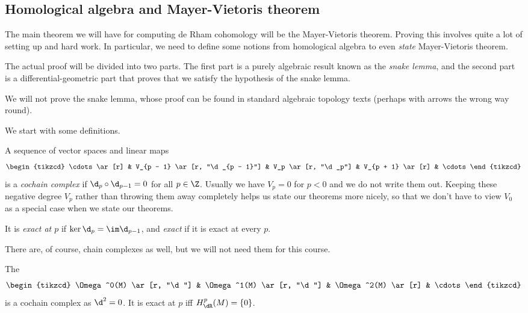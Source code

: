 \documentclass[a4paper]{article}
\begin{document}
\subsection{Homological algebra and Mayer-Vietoris theorem}
The main theorem we will have for computing de Rham cohomology will be the Mayer-Vietoris theorem. Proving this involves quite a lot of setting up and hard work. In particular, we need to define some notions from homological algebra to even \emph{state} Mayer-Vietoris theorem.

The actual proof will be divided into two parts. The first part is a purely algebraic result known as the \emph{snake lemma}, and the second part is a differential-geometric part that proves that we satisfy the hypothesis of the snake lemma.

We will not prove the snake lemma, whose proof can be found in standard algebraic topology texts (perhaps with arrows the wrong way round). %

We start with some definitions.
\begin{defi}
  A sequence of vector spaces and linear maps
  \[
    \begin{tikzcd}
      \cdots \ar[r] & V_{p - 1} \ar[r, "\d_{p - 1}"] & V_p \ar[r, "\d_p"] & V_{p + 1} \ar[r] & \cdots
    \end{tikzcd}
  \]
  is a \emph{cochain complex} if $\d_p \circ \d_{p - 1} = 0$ for all $p \in \Z$. Usually we have $V_p = 0$ for $p < 0$ and we do not write them out. Keeping these negative degree $V_p$ rather than throwing them away completely helps us state our theorems more nicely, so that we don't have to view $V_0$ as a special case when we state our theorems.

  It is \emph{exact at $p$} if $\ker \d_p = \im \d_{p - 1}$, and \emph{exact} if it is exact at every $p$.
\end{defi}
There are, of course, chain complexes as well, but we will not need them for this course.

\begin{eg}
  The 
  \[
    \begin{tikzcd}
      \Omega^0(M) \ar[r, "\d"] & \Omega^1(M) \ar[r, "\d"] & \Omega^2(M) \ar[r] & \cdots
    \end{tikzcd}
  \]
  is a cochain complex as $\d^2 = 0$. It is exact at $p$ iff $H_{\dR}^p(M) = \{0\}$.
\end{eg}
\end{document}
